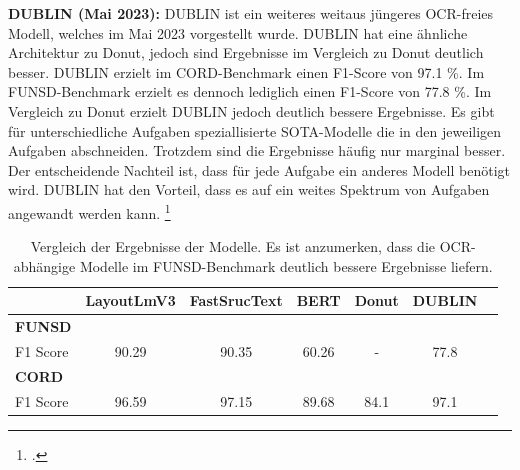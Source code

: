 \textbf{DUBLIN (Mai 2023):} \ac{DUBLIN} ist ein weiteres weitaus jüngeres OCR-freies Modell, welches im Mai 2023 vorgestellt wurde. DUBLIN hat eine ähnliche Architektur zu Donut, jedoch sind Ergebnisse im Vergleich zu Donut deutlich besser. DUBLIN erzielt im \ac{CORD}-Benchmark einen F1-Score von 97.1 \%. Im \ac{FUNSD}-Benchmark erzielt es dennoch lediglich einen F1-Score von 77.8 \%. Im Vergleich zu Donut erzielt \ac{DUBLIN} jedoch deutlich bessere Ergebnisse. Es gibt für unterschiedliche Aufgaben speziallisierte \ac{SOTA}-Modelle die in den jeweiligen Aufgaben abschneiden. Trotzdem sind die Ergebnisse häufig nur marginal besser. Der entscheidende Nachteil ist, dass für jede Aufgabe ein anderes Modell benötigt wird. \ac{DUBLIN} hat den Vorteil, dass es auf ein weites Spektrum von Aufgaben angewandt werden kann. \footcites[Vgl. dazu ausführlich][S. 698]{aggarwal_dublin_2023}

\begin{table}[htbp]
    \centering
    \begin{tabular}{lcccccc}
      \toprule
      & \textbf{LayoutLmV3} & \textbf{FastSrucText} & \textbf{BERT} & \textbf{Donut} & \textbf{DUBLIN} \\
      \midrule
      \textbf{FUNSD} \\
      F1 Score & 90.29 & 90.35 & 60.26 & - & 77.8 \\
      \addlinespace
      \textbf{CORD} \\
      F1 Score & 96.59 & 97.15 & 89.68 & 84.1 & 97.1 \\
      \bottomrule
    \end{tabular}
    \caption{Vergleich der Ergebnisse der Modelle. Es ist anzumerken, dass die OCR-abhängige Modelle im FUNSD-Benchmark deutlich bessere Ergebnisse liefern.}
  \end{table}

